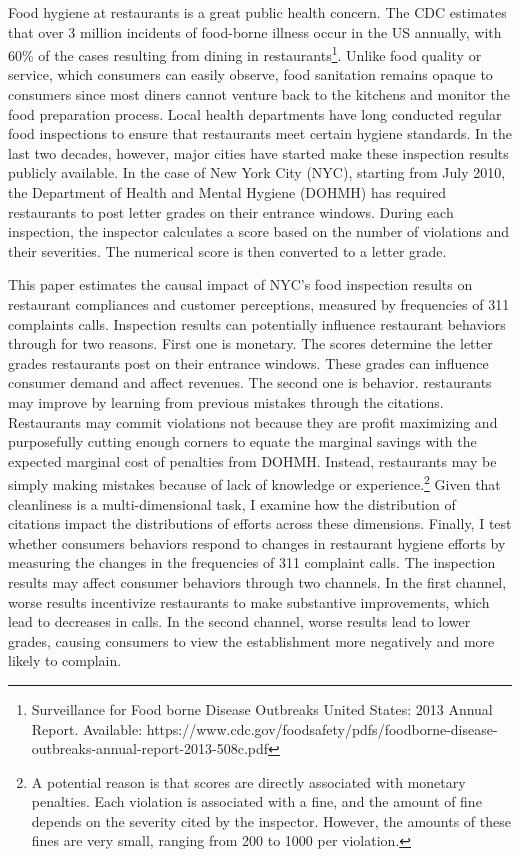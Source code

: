 \documentclass[11pt]{article}
\begin{document}
Food hygiene at restaurants is a great public health concern. The CDC estimates that over 3 million incidents of food-borne illness occur in the US annually, with 60\% of the cases resulting from  dining in restaurants\footnote{Surveillance for Food borne Disease Outbreaks United States: 2013 Annual Report. Available: https://www.cdc.gov/foodsafety/pdfs/foodborne-disease-outbreaks-annual-report-2013-508c.pdf}. Unlike food quality or service, which consumers can easily observe, food sanitation remains opaque to consumers since most diners cannot venture back to the kitchens and monitor the food preparation process. Local health departments have long conducted regular food inspections to ensure that restaurants meet certain hygiene standards. In the last two decades, however, major cities have started make these inspection results publicly available. In the case of New York City (NYC), starting from July 2010, the Department of Health and Mental Hygiene (DOHMH) has required restaurants to post letter grades on their entrance windows. During each inspection, the inspector calculates a score based on the number of violations and their severities. The numerical score is then converted to a letter grade. 

This paper estimates the causal impact of NYC's food inspection results on restaurant compliances and customer perceptions, measured by frequencies of 311 complaints calls. Inspection results can potentially influence restaurant behaviors through for two reasons. First one is monetary. The scores determine the letter grades restaurants post on their entrance windows. These grades can influence consumer demand and affect revenues. The second one is behavior. restaurants may improve by learning from previous mistakes through the citations. Restaurants may commit violations not because they are profit maximizing and purposefully cutting enough corners to equate the marginal savings with the expected marginal cost of penalties from DOHMH. Instead, restaurants may be simply making mistakes because of lack of knowledge or experience.\footnote{A potential reason is that scores are directly associated with monetary penalties. Each violation is associated with a fine, and the amount of fine depends on the severity cited by the inspector. However, the amounts of these fines are very small, ranging from 200 to 1000 per violation.} Given that cleanliness is a multi-dimensional task, I examine how the distribution of citations impact the distributions of efforts across these dimensions. Finally, I test whether consumers behaviors respond to changes in restaurant hygiene efforts by measuring the changes in the frequencies of 311 complaint calls. The inspection results may affect consumer behaviors through two channels. In the first channel, worse results incentivize restaurants to make substantive improvements, which lead to decreases in calls. In the second channel, worse results lead to lower grades, causing consumers to view the establishment more negatively and more likely to complain. 
\end{document}
